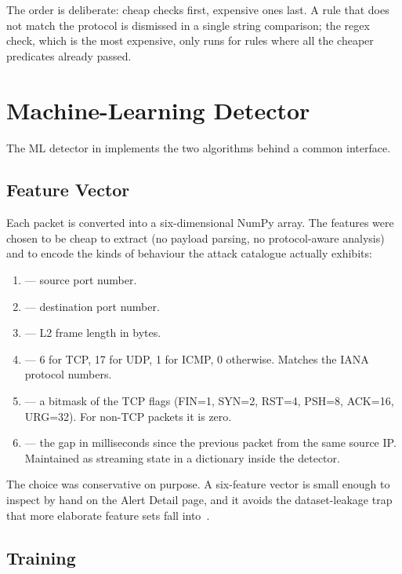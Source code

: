 The order is deliberate: cheap checks first, expensive ones last.
A rule that does not match the protocol is dismissed in a single
string comparison; the regex check, which is the most expensive,
only runs for rules where all the cheaper predicates already
passed.

\section{Machine-Learning Detector}
\label{sec:design-ml}

The ML detector in 
implements the two algorithms behind a common interface.

\subsection{Feature Vector}
\label{sec:design-features}

Each packet is converted into a six-dimensional NumPy array. The
features were chosen to be cheap to extract (no payload parsing,
no protocol-aware analysis) and to encode the kinds of behaviour
the attack catalogue actually exhibits:

\begin{enumerate}
  \item {} --- source port number.
  \item {} --- destination port number.
  \item {} --- L2 frame length in bytes.
  \item {} --- 6 for TCP, 17 for UDP, 1 for ICMP, 0
    otherwise. Matches the IANA protocol numbers.
  \item {} --- a bitmask of the TCP flags (FIN=1,
    SYN=2, RST=4, PSH=8, ACK=16, URG=32). For non-TCP packets it
    is zero.
  \item {} --- the gap in milliseconds since
    the previous packet from the same source IP. Maintained as
    streaming state in a dictionary inside the detector.
\end{enumerate}

The choice was conservative on purpose. A six-feature vector is
small enough to inspect by hand on the Alert Detail page, and it
avoids the dataset-leakage trap that more elaborate feature sets
fall into~\cite{sommer2010outside}.

\subsection{Training}
\label{sec:design-ml-train}

